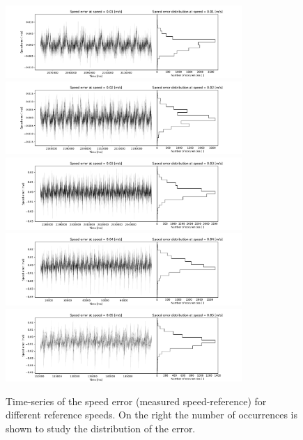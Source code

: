 \documentclass[12pt,a4paper, twoside]{article}
\begin{document}
\begin{figure}[htp]
	\centering
	\includegraphics[width=0.8\textwidth]{fig/speed_error_0}\\
	\includegraphics[width=0.8\textwidth]{fig/speed_error_1}\\
	\includegraphics[width=0.8\textwidth]{fig/speed_error_2}\\
	\includegraphics[width=0.8\textwidth]{fig/speed_error_3}\\
	\includegraphics[width=0.8\textwidth]{fig/speed_error_4}
	\caption[Speed error time-series]{Time-series of the speed error (measured speed-reference) for different reference speeds. On the right the number of occurrences is shown to study the distribution of the error.}\label{fig:speed_error}
\end{figure}
\end{document}
